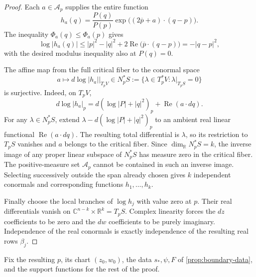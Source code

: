 \begin{proof}
Each $a\in\mathcal{A}_p$ supplies the entire function
\[
 h_a(q)=\frac{P(q)}{P(p)}
       \exp\bigl((2\overline p+a)\cdot(q-p)\bigr).
\]
The inequality $\Phi_a(q)\leq\Phi_a(p)$ gives
\[
 \log|h_a(q)|
 \leq |p|^2-|q|^2
       +2\operatorname{Re}\bigl(\overline p\cdot(q-p)\bigr)
 =-|q-p|^2,
\]
with the desired modulus inequality also at $P(q)=0$.

The affine map from the full critical fiber to the conormal space
\[
 a\longmapsto
 \left.d\log|h_a|\right|_{T_pV}
 \in N_p^*S
 :=\{\lambda\in T_p^*V:\lambda|_{T_pS}=0\}
\]
is surjective.  Indeed, on $T_pV$,
\[
 d\log|h_a|_p
   =d(\log|P|+|q|^2)_p+\operatorname{Re}(a\cdot dq).
\]
For any $\lambda\in N_p^*S$, extend $\lambda-d(\log|P|+|q|^2)_p$ to an ambient real linear functional $\operatorname{Re}(a\cdot dq)$.  The resulting total differential is $\lambda$, so its restriction to $T_pS$ vanishes and $a$ belongs to the critical fiber.  Since $\dim_{\mathbb{R}}N_p^*S=k$, the inverse image of any proper linear subspace of $N_p^*S$ has measure zero in the critical fiber. The positive-measure set $\mathcal{A}_p$ cannot be contained in such an inverse image.  Selecting successively outside the span already chosen gives $k$ independent conormals and corresponding functions $h_1,\ldots,h_k$.

Finally choose the local branches of $\log h_j$ with value zero at $p$.  Their real differentials vanish on $\mathbb{C}^{n-k}\times\mathbb{R}^k=T_pS$.  Complex linearity forces the $dz$ coefficients to be zero and the $dw$ coefficients to be purely imaginary.  Independence of the real conormals is exactly independence of the resulting real rows $\beta_j$.
\end{proof}

Fix the resulting $p$, its chart $(z_0,w_0)$, the data $s_*,\psi,F$ of \cref{prop:boundary-data}, and the support functions for the rest of the proof.
